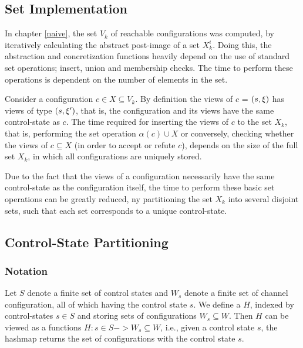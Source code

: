 

\subsection{Set Implementation}
In chapter \ref{naive}, the set $V_k$ of reachable configurations was computed, by iteratively calculating the abstract post-image of a set $X_k^i$. Doing this, the abstraction and concretization functions heavily depend on the use of standard set operations; insert, union and membership checks. The time to perform these operations is dependent on the number of elements in the set.

Consider a configuration $c \in X \subseteq V_k$. By definition the views of $c$ = $(s, \xi)$ has views of type $(s,\xi')$, that is, the configuration and its views have the same control-state as $c$. The time required for inserting the views of $c$ to the set $X_k$, that is, performing the set operation $\alpha(c) \cup X$ or conversely, checking whether the views of $c \subseteq X$ (in order to accept or refute $c$), depends on the size of the full set $X_k$, in which all configurations are uniquely stored.

Due to the fact that the views of a configuration necessarily have the same control-state as the configuration itself, the time to perform these basic set operations can be greatly reduced, ny partitioning the set $X_k$ into several disjoint sets, such that each set corresponds to a unique control-state.
\subsection{Control-State Partitioning}
\subsubsection{Notation}
Let $S$ denote a finite set of control states and $W_s$ denote a finite set of channel configuration, all of which having the control state $s$. We define a  $H$, indexed by control-states $s \in S$ and storing sets of configurations $W_s \subseteq W$. Then $H$ can be viewed as a functions $H : s \in S -> W_s \subseteq W$, i.e., given a control state $s$, the hashmap returns the set of configurations with the control state $s$. 

